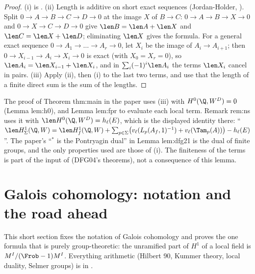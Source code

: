 \begin{proof}
(i) is . (ii) Length is additive on short exact sequences (Jordan-Holder, ). Split $0\to A\to B\to C\to D\to0$ at the image $X$ of $B\to C$:
$0\to A\to B\to X\to0$ and $0\to X\to C\to D\to0$ give $\len B=\len A+\len X$ and $\len C=\len X+\len D$; eliminating $\len X$ gives the formula. For a general exact
sequence $0\to A_1\to\dots\to A_r\to0$, let $X_i$ be the image of $A_i\to A_{i+1}$; then $0\to X_{i-1}\to A_i\to X_i\to0$ is exact (with $X_0=X_r=0$), so
$\len A_i=\len X_{i-1}+\len X_i$, and in $\sum_i(-1)^i\len A_i$ the terms $\len X_i$ cancel in pairs. (iii) Apply (ii), then (i) to the
last two terms, and use that the length of a finite direct sum is the sum of the lengths.
\end{proof}

\begin{paperlink}\label{pl:cohomology:lengths}
The proof of Theorem thm:main in the paper uses (iii) with $H^0(\Q,W^D)=0$ (Lemma lem:h0), and Lemma lem:fpr to evaluate each local term. Remark rem:ns uses it with
$\len H^0(\Q,W^D)=h_\ell(E)$, which is the displayed identity there: ``$\len H^1_\Sigma(\Q,W)=\len H^1_f(\Q,W)+\sum_{p\in\Sigma}\bigl(v_\ell(L_p(A_f,1)^{-1})+v_\ell(\Tam_p(A))\bigr)-h_\ell(E)$''. The paper's
``$^*$ is the Pontryagin dual'' in Lemma lem:dfg21 is the dual of finite groups, and the only properties used are those of (i). The finiteness of the terms is
part of the input of  (DFG04's theorems), not a consequence of this lemma.
\end{paperlink}

\section{Galois cohomology: notation and the road ahead}\label{sec:cohomology:galois}

This short section fixes the notation of Galois cohomology and proves the one formula that is purely group-theoretic: the unramified part of $H^1$ of a
local field is $M^{I}/(\Frob-1)M^I$. Everything arithmetic (Hilbert 90, Kummer theory, local duality, Selmer groups) is in .

